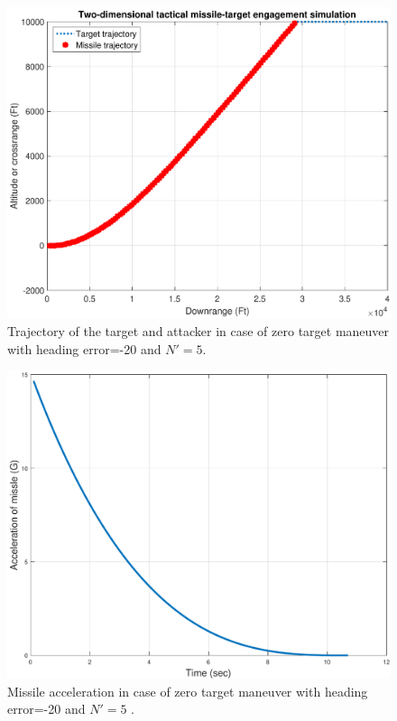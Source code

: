 \begin{figure}[H]
	\centering
	\includegraphics[scale = 0.57]{fig/trajectoryXNT0HE20N5.pdf}
	\caption{Trajectory of the target and attacker in case of zero target maneuver with heading error=-20 and $N'=5$.}
	\label{trajectory20N5}
\end{figure}


\begin{figure}[H]
	\centering
	\includegraphics[scale = 0.57]{fig/MissileAccelerationXNT0HE20N5.pdf}
	\caption{Missile acceleration in case of zero target maneuver with heading error=-20 and $N'=5$ .}
	\label{missile acceleration20N5}
\end{figure}

